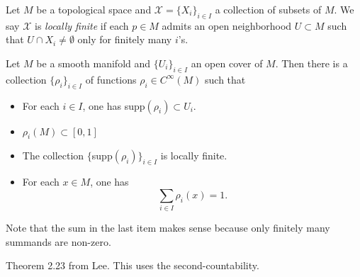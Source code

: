 \documentclass{ximera}
\begin{document}
    \begin{definition}
        Let $M$ be a topological space and $ \mathcal{X} = \{ X_i \} _{i \in I}$ a collection of subsets of $M$. We say $\mathcal{X}$ is \emph{locally finite} if each $p \in M$ admits an open neighborhood $U \subset M$ such that $U \cap X_i \neq \emptyset $ only for finitely many $i$'s. 
    \end{definition}

    \begin{theorem}\label{thm:pou}
        Let $M$ be a smooth manifold and $\{ U_i \} _{i \in I} $ an open cover of $M$. Then there is a collection $\{ \rho_i \} _{i \in I}$ of functions $\rho _i \in C^{\infty }(M)$ such that
        \begin{itemize}
            \item For each $i \in I$, one has supp$(\rho_i) \subset U_i$.
            \item $\rho_i (M)\subset [0,1]$
            \item The collection $\{ $supp$(\rho_i)\}_{i \in I}$ is locally finite.
            \item For each $x \in M$, one has
            \[      \sum_{i \in I} \rho _i (x) = 1  .            \]
        \end{itemize}
    Note that the sum in the last item makes sense because only finitely many summands are non-zero. 


    \begin{solution}
        Theorem 2.23 from Lee. This uses the second-countability.
    \end{solution}
    \end{theorem}
\end{document}

